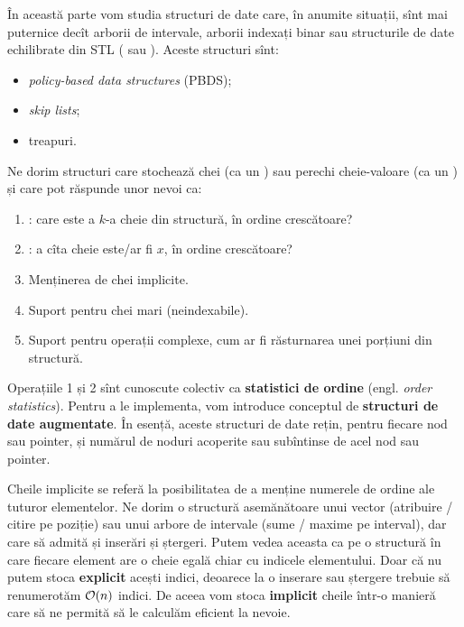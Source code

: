 \documentclass[../main.tex]{subfiles}
\begin{document}
În această parte vom studia structuri de date care, în anumite situații, sînt mai puternice decît arborii de intervale, arborii indexați binar sau structurile de date echilibrate din STL ( sau ). Aceste structuri sînt:

\begin{itemize}
  \item \textit{policy-based data structures} (PBDS);
  \item \textit{skip lists};
  \item treapuri.
\end{itemize}

Ne dorim structuri care stochează chei (ca un ) sau perechi cheie-valoare (ca un ) și care pot răspunde unor nevoi ca:

\begin{enumerate}
  \item {}: care este a $k$-a cheie din structură, în ordine crescătoare?
  \item {}: a cîta cheie este/ar fi $x$, în ordine crescătoare?
  \item Menținerea de chei implicite.
  \item Suport pentru chei mari (neindexabile).
  \item Suport pentru operații complexe, cum ar fi răsturnarea unei porțiuni din structură.
\end{enumerate}

Operațiile 1 și 2 sînt cunoscute colectiv ca \textbf{statistici de ordine} (engl. \textit{order statistics}). Pentru a le implementa, vom introduce conceptul de \textbf{structuri de date augmentate}. În esență, aceste structuri de date rețin, pentru fiecare nod sau pointer, și numărul de noduri acoperite sau subîntinse de acel nod sau pointer.

Cheile implicite se referă la posibilitatea de a menține numerele de ordine ale tuturor elementelor. Ne dorim o structură asemănătoare unui vector (atribuire / citire pe poziție) sau unui arbore de intervale (sume / maxime pe interval), dar care să admită și inserări și ștergeri. Putem vedea aceasta ca pe o structură în care fiecare element are o cheie egală chiar cu indicele elementului. Doar că nu putem stoca \textbf{explicit} acești indici, deoarece la o inserare sau ștergere trebuie să renumerotăm $\mathcal{O}(n)$ indici. De aceea vom stoca \textbf{implicit} cheile într-o manieră care să ne permită să le calculăm eficient la nevoie.
\end{document}

